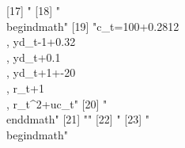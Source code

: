 [17] "%
[18] "\\begin{dmath}"                                                                                                                                                                                                                                                                                                                              
[19] "{c_{t}}=100+0.2812\\, {yd_{t-1}}+0.32\\, {yd_{t}}+0.1\\, {yd_{t+1}}+-20\\, {r_{t}}+1\\, {r_{t}}^{2}+{uc_{t}}"                                                                                                                                                                                                                                
[20] "\\end{dmath}"                                                                                                                                                                                                                                                                                                                                
[21] ""                                                                                                                                                                                                                                                                                                                                            
[22] "%
[23] "\\begin{dmath}"                                                                                                                                                                                                                                                                                                                              
